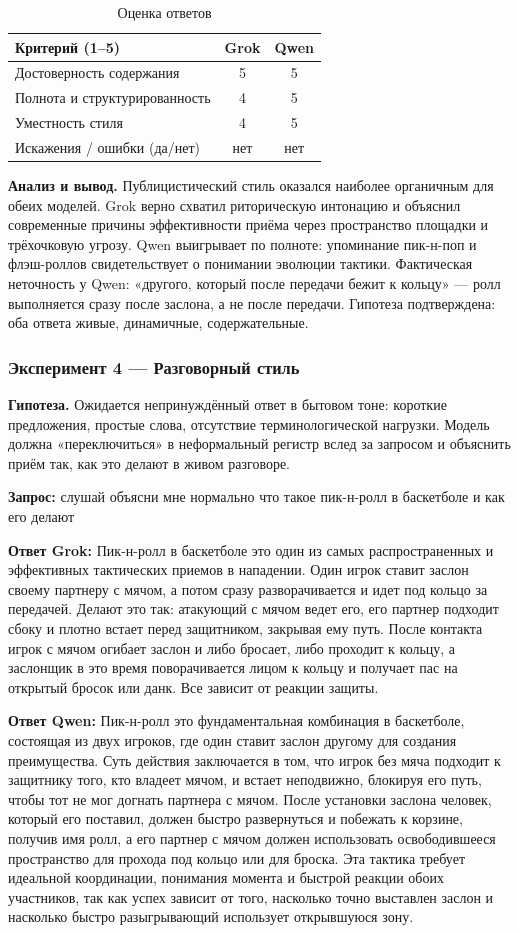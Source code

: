 \documentclass[a4paper, final]{article}
\newcommand{\scoretablefilled}[8]{%
    \vspace{4pt}
    \begin{table}[h!]
    \centering
    \small
    \begin{tabular}{|l|c|c|}
    \hline
    \textbf{Критерий (1--5)} & \textbf{Grok} & \textbf{Qwen} \\
    \hline
    Достоверность содержания & #1 & #2 \\
    \hline
    Полнота и структурированность & #3 & #4 \\
    \hline
    Уместность стиля & #5 & #6 \\
    \hline
    Искажения / ошибки (да/нет) & #7 & #8 \\
    \hline
    \end{tabular}
    \caption{Оценка ответов}
    \end{table}
    \vspace{2pt}
}
\begin{document}
\scoretablefilled{5}{5}{4}{5}{4}{5}{нет}{нет}

\noindent\textbf{Анализ и вывод.} Публицистический стиль оказался наиболее органичным для обеих моделей. Grok верно схватил риторическую интонацию и объяснил современные причины эффективности приёма через пространство площадки и трёхочковую угрозу. Qwen выигрывает по полноте: упоминание пик-н-поп и флэш-роллов свидетельствует о понимании эволюции тактики. Фактическая неточность у Qwen: «другого, который после передачи бежит к кольцу» — ролл выполняется сразу после заслона, а не после передачи. Гипотеза подтверждена: оба ответа живые, динамичные, содержательные.

\newpage

\subsubsection{Эксперимент 4 — Разговорный стиль}

\noindent\textbf{Гипотеза.} Ожидается непринуждённый ответ в бытовом тоне: короткие предложения, простые слова, отсутствие терминологической нагрузки. Модель должна «переключиться» в неформальный регистр вслед за запросом и объяснить приём так, как это делают в живом разговоре.

\noindent\textbf{Запрос:} слушай объясни мне нормально что такое пик-н-ролл в баскетболе и как его делают

\noindent\textbf{Ответ Grok:} Пик-н-ролл в баскетболе это один из самых распространенных и эффективных тактических приемов в нападении. Один игрок ставит заслон своему партнеру с мячом, а потом сразу разворачивается и идет под кольцо за передачей. Делают это так: атакующий с мячом ведет его, его партнер подходит сбоку и плотно встает перед защитником, закрывая ему путь. После контакта игрок с мячом огибает заслон и либо бросает, либо проходит к кольцу, а заслонщик в это время поворачивается лицом к кольцу и получает пас на открытый бросок или данк. Все зависит от реакции защиты.

\noindent\textbf{Ответ Qwen:} Пик-н-ролл это фундаментальная комбинация в баскетболе, состоящая из двух игроков, где один ставит заслон другому для создания преимущества. Суть действия заключается в том, что игрок без мяча подходит к защитнику того, кто владеет мячом, и встает неподвижно, блокируя его путь, чтобы тот не мог догнать партнера с мячом. После установки заслона человек, который его поставил, должен быстро развернуться и побежать к корзине, получив имя ролл, а его партнер с мячом должен использовать освободившееся пространство для прохода под кольцо или для броска. Эта тактика требует идеальной координации, понимания момента и быстрой реакции обоих участников, так как успех зависит от того, насколько точно выставлен заслон и насколько быстро разыгрывающий использует открывшуюся зону.
\end{document}
